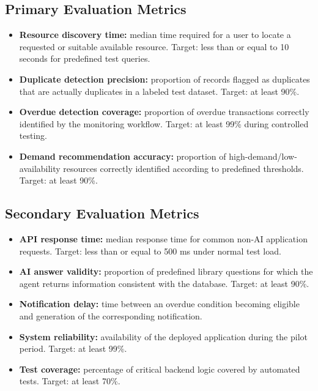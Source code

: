 \documentclass[11pt,a4paper]{article}
\begin{document}
\subsection{Primary Evaluation Metrics}
\begin{itemize}
    \item \textbf{Resource discovery time:} median time required for a user to locate a requested or suitable available resource. Target: less than or equal to 10 seconds for predefined test queries.
    \item \textbf{Duplicate detection precision:} proportion of records flagged as duplicates that are actually duplicates in a labeled test dataset. Target: at least 90\%.
    \item \textbf{Overdue detection coverage:} proportion of overdue transactions correctly identified by the monitoring workflow. Target: at least 99\% during controlled testing.
    \item \textbf{Demand recommendation accuracy:} proportion of high-demand/low-availability resources correctly identified according to predefined thresholds. Target: at least 90\%.
\end{itemize}

\subsection{Secondary Evaluation Metrics}
\begin{itemize}
    \item \textbf{API response time:} median response time for common non-AI application requests. Target: less than or equal to 500 ms under normal test load.
    \item \textbf{AI answer validity:} proportion of predefined library questions for which the agent returns information consistent with the database. Target: at least 90\%.
    \item \textbf{Notification delay:} time between an overdue condition becoming eligible and generation of the corresponding notification.
    \item \textbf{System reliability:} availability of the deployed application during the pilot period. Target: at least 99\%.
    \item \textbf{Test coverage:} percentage of critical backend logic covered by automated tests. Target: at least 70\%.
\end{itemize}
\end{document}
